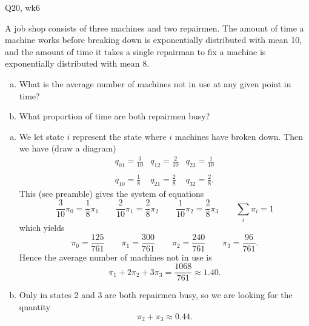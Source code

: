 \begin{problem}{Q20, wk6}{}


    A job shop consists of three machines and two repairmen. The amount of time a machine works before breaking down is exponentially distributed with mean 10, and the amount of time it takes a single repairman to fix a machine is exponentially distributed with mean 8.
        \begin{enumerate}[a)]
            \item What is the average number of machines not in use at any given point in time?
            \item What proportion of time are both repairmen busy?
        \end{enumerate}

    \tcblower

    \begin{enumerate}[a)]
        \item We let state $i$ represent the state where $i$ machines have broken down. Then we have (draw a diagram)
            $$ \begin{matrix}
                    q_{01} = \frac{3}{10} & q_{12} = \frac{2}{10} & q_{23} = \frac{1}{10} \\ \\
                    q_{10} = \frac{1}{8} & q_{21} = \frac{2}{8} & q_{32} = \frac{2}{8} .
                \end{matrix}
            $$
        This (see preamble) gives the system of equations
            $$
                \frac{3}{10} \pi_0 = \frac{1}{8} \pi_1 \qquad
                \frac{2}{10} \pi_1 = \frac{2}{8} \pi_2 \qquad
                \frac{1}{10} \pi_2 = \frac{2}{8} \pi_3 \qquad 
                \sum_i \pi_i = 1
            $$
        which yields
            $$
                \pi_0 = \frac{125}{761} \qquad
                \pi_1 = \frac{300}{761} \qquad
                \pi_2 = \frac{240}{761} \qquad
                \pi_3 = \frac{96}{761} .
            $$
        Hence the average number of machines not in use is
            $$ \pi_1 + 2 \pi_2 + 3 \pi_3 = \frac{1068}{761} \approx 1.40 . $$
        \item Only in states 2 and 3 are both repairmen busy, so we are looking for the quantity
            $$ \pi_2 + \pi_3 \approx 0.44 . $$
    \end{enumerate}

\end{problem}

